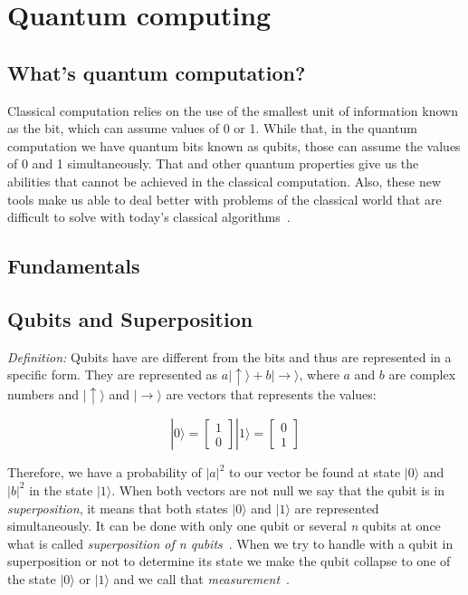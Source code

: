 \documentclass[conference]{IEEEtran}
\begin{document}
\section{Quantum computing}\label{sec:qc}
\subsection{What's quantum computation?}\label{subsec:what's-quantum-computation?}

Classical computation relies on the use of the smallest unit of information known as the bit, which can assume values of
0 or 1.
While that, in the quantum computation we have quantum bits known as qubits, those can
assume the values of 0 and 1 simultaneously.
That and other quantum properties give us the abilities that cannot be achieved in the classical computation.
Also, these new tools make us able to deal better with problems of the classical world that are difficult
to solve with today's classical algorithms~\cite{russon_2017,deutsch1992rapid}.

\subsection{Fundamentals}\label{subsec:fundamentals}

\subsection{Qubits and Superposition}\label{subsec:qubits-and-superposition}

\textit{Definition:} Qubits have are different from the bits and thus are represented in a specific form.
They are represented as \(a|\uparrow\rangle + b|\rightarrow\rangle\), where \(a\) and \(b\) are complex
numbers and \(|\uparrow\rangle\) and \(|\rightarrow\rangle\) are vectors that represents the values:

\[ |0\rangle = \begin{bmatrix} 1 \\ 0\end{bmatrix}  |1\rangle = \begin{bmatrix} 0 \\ 1\end{bmatrix}\]

Therefore, we have a probability of \(|a|^2\) to our vector be found at state \(|0\rangle \) and
\(|b|^2\) in the state \(|1\rangle\).
When both vectors are not null we say that the qubit is in \textit{superposition}, it means that both states
\(|0\rangle\) and \(|1\rangle\) are represented simultaneously.
It can be done with only one qubit or several \textit{n} qubits at once what is called
\textit{superposition of n qubits}~\cite{yanofsky2008quantum,rieffel2014quantum}.
When we try to handle with a qubit in superposition or not to determine its state we make the
qubit collapse to one of the state \(|0\rangle\) or \(|1\rangle\) and we call that
\textit{measurement}~\cite{yanofsky2008quantum,rieffel2014quantum}.
\end{document}

